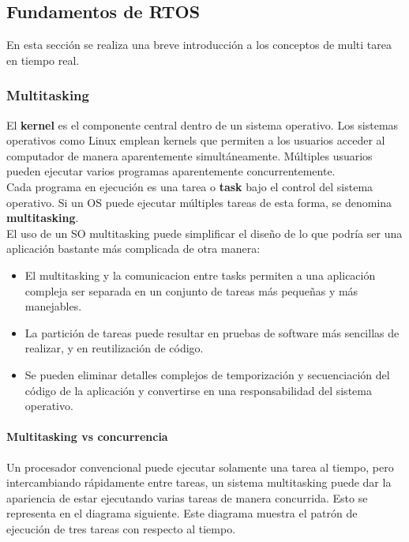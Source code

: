 \subsection{Fundamentos de RTOS}

En esta sección se realiza una breve introducción a los conceptos de multi tarea en tiempo real.

\subsubsection{Multitasking}

El \textbf{kernel} es el componente central dentro de un sistema operativo. Los sistemas operativos como Linux emplean kernels que permiten a los usuarios acceder al computador de manera aparentemente simultáneamente. Múltiples usuarios pueden ejecutar varios programas aparentemente concurrentemente. \\

Cada programa en ejecución es una tarea o \textbf{task} bajo el control del sistema operativo. Si un OS puede ejecutar múltiples tareas de esta forma, se denomina \textbf{multitasking}.\\

El uso de un SO multitasking puede simplificar el diseño de lo que podría ser una aplicación bastante más complicada de otra manera:

\begin{itemize}
    \item El multitasking y la comunicacion entre tasks permiten a una aplicación compleja ser separada en un conjunto de tareas más pequeñas y más manejables.
    \item La partición de tareas puede resultar en pruebas de software más sencillas de realizar, y en reutilización de código.
    \item Se pueden eliminar detalles complejos de temporización y secuenciación del código de la aplicación y convertirse en una responsabilidad del sistema operativo.
\end{itemize}

\paragraph{Multitasking vs concurrencia}

Un procesador convencional puede ejecutar solamente una tarea al tiempo, pero intercambiando rápidamente entre tareas, un sistema multitasking puede dar la apariencia de estar ejecutando varias tareas de manera concurrida. Esto se representa en el diagrama siguiente. Este diagrama muestra el patrón de ejecución de tres tareas con respecto al tiempo. 

